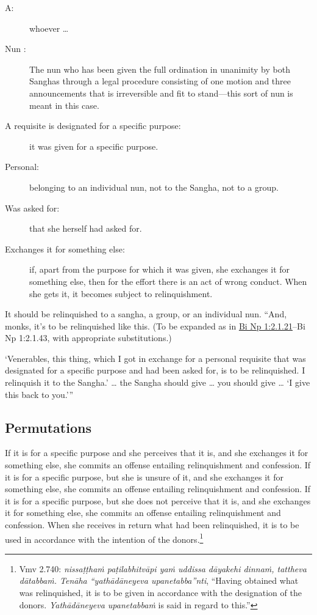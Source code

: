 \documentclass[12pt,openany]{book}%
\begin{document}
\begin{description}%
\item[A: ] whoever … %
\item[Nun : ] The nun who has been given the full ordination in unanimity by both Sanghas through a legal procedure consisting of one motion and three announcements that is irreversible and fit to stand—this sort of nun is meant in this case. %
\item[A requisite is designated for a specific purpose: ] it was given for a specific purpose. %
\item[Personal: ] belonging to an individual nun, not to the Sangha, not to a group. %
\item[Was asked for: ] that she herself had asked for. %
\item[Exchanges it for something else: ] if, apart from the purpose for which it was given, she exchanges it for something else, then for the effort there is an act of wrong conduct. When she gets it, it becomes subject to relinquishment. %
\end{description}

It should be relinquished to a sangha, a group, or an individual nun. “And, monks, it’s to be relinquished like this.  (To be expanded as in \href{https://suttacentral.net/pli-tv-bi-vb-np1/en/brahmali\#2.1.21}{Bi Np 1:2.1.21}–Bi Np 1:2.1.43, with appropriate substitutions.) 

‘Venerables, this thing, which I got in exchange for a personal requisite that was designated for a specific purpose and had been asked for, is to be relinquished. I relinquish it to the Sangha.’ … the Sangha should give … you should give … ‘I give this back to you.’” 

\subsection*{Permutations }

If it is for a specific purpose and she perceives that it is, and she exchanges it for something else, she commits an offense entailing relinquishment and confession. If it is for a specific purpose, but she is unsure of it, and she exchanges it for something else, she commits an offense entailing relinquishment and confession. If it is for a specific purpose, but she does not perceive that it is, and she exchanges it for something else, she commits an offense entailing relinquishment and confession. When she receives in return what had been relinquished, it is to be used in accordance with the intention of the donors.\footnote{Vmv 2.740: \textit{\textsanskrit{nissaṭṭhaṁ} \textsanskrit{paṭilabhitvāpi} \textsanskrit{yaṁ} uddissa \textsanskrit{dāyakehi} \textsanskrit{dinnaṁ}, tattheva \textsanskrit{dātabbaṁ}. \textsanskrit{Tenāha} “\textsanskrit{yathādāneyeva} upanetabba”nti}, “Having obtained what was relinquished, it is to be given in accordance with the designation of the donors. \textit{\textsanskrit{Yathādāneyeva} \textsanskrit{upanetabbaṁ}} is said in regard to this.” } 
\end{document}
